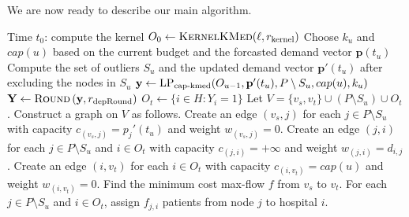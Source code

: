 We are now ready to describe our main algorithm.
\begin{algorithm}[h]
\caption{$\textsc{OnlineKMed} \left(H, P, \mathbf{p}, w, \ell, r_{\text{kernel}}, r_{\text{depRound}} \right)$}
\begin{algorithmic}[1]
\STATE Time $t_0$: compute the kernel $O_0 \gets \textsc{KernelKMed}(\ell, r_{\text{kernel}})$
	\STATE Choose $k_u$ and $cap(u)$ based on the current budget and the forcasted demand vector $\mathbf{p}(t_u)$
	\STATE Compute the set of outliers $S_u$ and the updated demand vector $\mathbf{p}'(t_u)$ after excluding the nodes in $S_u$
	\STATE $\mathbf{y} \gets \text{LP}_{\text{cap-kmed}}(O_{u-1}, \mathbf{p}'(t_u), P \setminus S_u, cap(u), k_u)$
	\STATE $\mathbf{Y} \gets \textsc{Round}\left( \mathbf{y}, r_{\text{depRound}} \right)$
	\STATE $O_t \gets \{i \in H: Y_i = 1\}$
	\STATE Let $V = \{v_s, v_t\} \cup (P \setminus S_u) \cup O_t$. Construct a graph on $V$ as follows.
	\STATE Create an edge $(v_s, j)$ for each $j \in P \setminus S_u$ with capacity $c_{(v_s, j)} = p_j'(t_u)$ and weight $w_{(v_s, j)} = 0$.
	\STATE Create an edge $(j, i)$ for each $j \in P \setminus S_u$ and $i \in O_t$ with capacity $c_{(j, i)} = +\infty$ and weight $w_{(j, i)} = d_{i, j}$.
	\STATE Create an edge $(i, v_t)$ for each $i \in O_t$ with capacity $c_{(i, v_t)} = cap(u)$ and weight $w_{(i, v_t)} = 0$.
	\STATE Find the minimum cost max-flow $f$ from $v_s$ to $v_t$. For each $j \in P \setminus S_u$ and $i \in O_t$, assign $f_{j,i}$ patients from node $j$ to hospital $i$.
\ENDFOR
\end{algorithmic} 
\end{algorithm}







